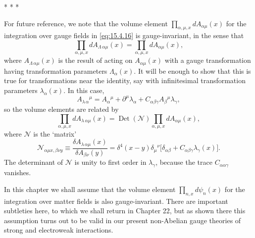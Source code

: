 \begin{center}
  * * *
\end{center}

For future reference, we note that the volume element
$\prod_{\alpha,\mu,x}dA_{\alpha\mu}(x)$ for the integration over gauge fields
in \eqref{eq:15.4.16} is gauge-invariant, in the sense that
\begin{equation}
  \prod_{\alpha,\mu,x}dA_{\Lambda\,\alpha\mu}(x)
  =\prod_{\alpha,\mu,x}dA_{\alpha\mu}(x),
  \tag{15.4.17}\label{eq:15.4.17}
\end{equation}
where $A_{\Lambda\,\alpha\mu}(x)$ is the result of acting on
$A_{\alpha\mu}(x)$ with a gauge transformation having transformation
parameters $\Lambda_\alpha(x)$. It will be enough to show that this is true for
transformations near the identity, say with infinitesimal transformation
parameters $\lambda_\alpha(x)$. In this case,
\begin{equation*}
  A_{\lambda\,\alpha}{}^\mu=A_\alpha{}^\mu+\partial^\mu\lambda_\alpha
  +C_{\alpha\beta\gamma}A_\beta{}^\mu\lambda_\gamma,
\end{equation*}
so the volume elements are related by
\begin{equation*}
  \prod_{\alpha,\mu,x}dA_{\lambda\,\alpha\mu}(x)
  =\operatorname{Det}(\mathcal N)
  \prod_{\alpha,\mu,x}dA_{\alpha\mu}(x),
\end{equation*}
where $\mathcal N$ is the `matrix'
\begin{equation*}
  \mathcal N_{\alpha\mu x,\beta\nu y}
  \equiv\frac{\delta A_{\lambda\,\alpha\mu}(x)}
  {\delta A_{\beta\nu}(y)}
  =\delta^4(x-y)\delta_\mu{}^\nu
  \bigl[\delta_{\alpha\beta}+C_{\alpha\beta\gamma}\lambda_\gamma(x)\bigr].
\end{equation*}
The determinant of $\mathcal N$ is unity to first order in $\lambda_\gamma$,
because the trace $C_{\alpha\alpha\gamma}$ vanishes.

In this chapter we shall assume that the volume element
$\prod_{n,x}d\psi_n(x)$ for the integration over matter fields is also
gauge-invariant. There are important subtleties here, to which we shall return
in Chapter 22, but as shown there this assumption turns out to be valid in our
present non-Abelian gauge theories of strong and electroweak interactions.
